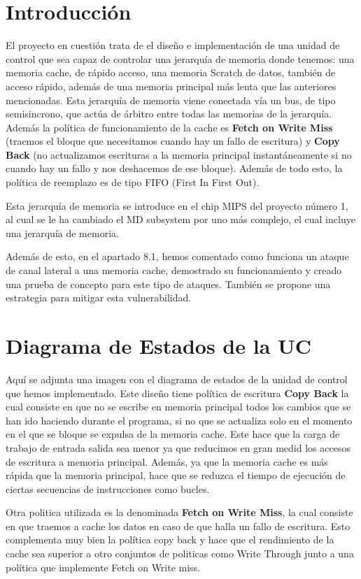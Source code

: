 \documentclass{article}
\begin{document}
\newpage

\tableofcontents

\newpage
\section{Introducción}
El proyecto en cuestión trata de el diseño e implementación de una unidad de control que sea capaz de controlar una jerarquía de memoria
donde tenemos: una memoria cache, de rápido acceso, una memoria Scratch de datos, también de acceso rápido, además de una memoria principal más lenta que las anteriores mencionadas.
Esta jerarquía de memoria viene conectada vía un bus, de tipo semisincrono, que actúa de árbitro entre todas las memorias de la jerarquía. Además la política de funcionamiento de la cache es \textbf{Fetch on Write Miss} (traemos el bloque que necesitamos cuando hay un fallo de escritura)
y \textbf{Copy Back} (no actualizamos escrituras a la memoria principal instantáneamente si no cuando hay un fallo y nos deshacemos de ese bloque). Además de todo esto, la política de reemplazo es de tipo FIFO (First In First Out). \par
Esta jerarquía de memoria se introduce en el chip MIPS del proyecto número 1, al cual se le ha cambiado el MD subsystem por uno más complejo, el cual incluye una jerarquía de memoria.\par
Además de esto, en el apartado 8.1, hemos comentado como funciona un ataque de canal lateral a una memoria cache, demostrado su funcionamiento y creado una prueba de concepto para este tipo de ataques. También se propone una estrategia para mitigar esta vulnerabilidad.

\section{Diagrama de Estados de la UC}
Aquí se adjunta una imagen con el diagrama de estados de la unidad de control que hemos implementado. Este diseño tiene política de escritura \textbf{Copy Back} la cual consiste
en que no se escribe en memoria principal todos los cambios que se han ido haciendo durante el programa, si no que se actualiza solo en el momento en el que se bloque se expulsa
de la memoria cache. Este hace que la carga de trabajo de entrada salida sea menor ya que reducimos en gran medid los accesos de escritura a memoria principal. Además, ya que la 
memoria cache es más rápida que la memoria principal, hace que se reduzca el tiempo de ejecución de ciertas secuencias de instrucciones como bucles.\par
Otra politica utilizada es la denominada \textbf{Fetch on Write Miss}, la cual consiste en que traemos a cache los datos en caso de que halla un fallo de escritura. Esto complementa
muy bien la política copy back y hace que el rendimiento de la cache sea superior a otro conjuntos de politicas como Write Through junto a una política que implemente Fetch on Write miss.\cite{RivoireCacheWrite}\par
\end{document}
